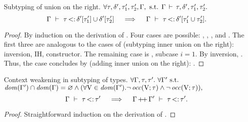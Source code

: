 \begin{lemma}{Subtyping of union on the right.}%
\label{lem:sub-union-right}
    $\forall \tau, \delta', \tau'_1, \tau'_2, \Gamma, \text{ s.t. }
    \Gamma\,\vdash\,\tau, \delta', \tau'_1, \tau'_2.$
    \[
        \Gamma\ \vdash\ \tau \operatorname{<:} \delta'[\tau'_1] \cup \delta'[\tau'_2]
        \quad\implies\quad
        \Gamma\ \vdash\ \tau \operatorname{<:} \delta'[\tau'_1 \cup \tau'_2].
    \]
\end{lemma}
\begin{proof}
    By induction on the derivation of
    .
    Four cases are possible: , , , and
    . The first three are analogous to the cases of
     (subtyping inner union on the right): 
    inversion, IH, constructor.
    The remaining case is , subcase $i=1$.
    By inversion, .
    Thus, the case concludes by  (adding inner
    union on the right):
    .
\end{proof}

\begin{lemma}{Context weakening in subtyping of types.}%
\label{lem:subty-weakening}
    $\forall \Gamma, \tau, \tau'.\ \forall \Gamma' \text{ s.t. }$\\
    $\operatorname{\mathit{dom}}(\Gamma') \cap \operatorname{\mathit{dom}}(\Gamma) = \varnothing \land 
    (\forall \mathrm{V} \in \operatorname{\mathit{dom}}(\Gamma'). 
        \lnot \operatorname{\mathit{occ}}(\mathrm{V};\tau) \land \lnot \operatorname{\mathit{occ}}(\mathrm{V};\tau)),$
    \[ \Gamma\ \vdash\ \tau \operatorname{<:} \tau' \quad\implies\quad 
    \Gamma\operatorname{+\!+}\Gamma'\ \vdash\ \tau \operatorname{<:} \tau'. \]
\end{lemma}
\begin{proof}
    Straightforward induction on the derivation of .
\end{proof}


